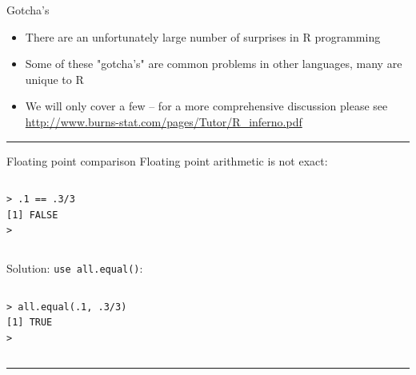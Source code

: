 \documentclass[table,smaller]{beamer}
\begin{document}
\begin{frame}[label=sec-8-1]{Gotcha's}
\begin{itemize}
\item There are an unfortunately large number of surprises in R programming
\item Some of these "gotcha's" are common problems in other languages, many are unique to R
\item We will only cover a few -- for a more comprehensive discussion please see \url{http://www.burns-stat.com/pages/Tutor/R_inferno.pdf}
\end{itemize}

\rule{\linewidth}{0.5pt}
\end{frame}
\begin{frame}[fragile,label=sec-8-2]{Floating point comparison}
 Floating point arithmetic is not exact:
\vspace{-.5em}
\begin{columns}
\begin{block}{}
\begin{verbatim}
> .1 == .3/3
[1] FALSE
>
\end{verbatim}
\end{block}
\end{columns}
\vspace{.5em}

Solution: \verb~use all.equal()~:
\vspace{-.5em}
\begin{columns}
\begin{block}{}
\begin{verbatim}
> all.equal(.1, .3/3)
[1] TRUE
>
\end{verbatim}
\end{block}
\end{columns}
\vspace{.5em}

\rule{\linewidth}{0.5pt}
\end{frame}
\end{document}
